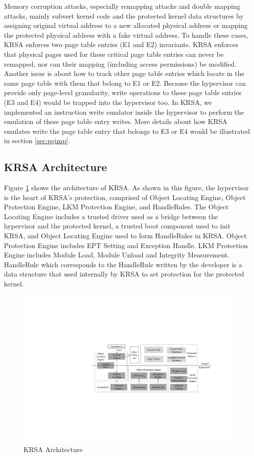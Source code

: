 \documentclass[conference]{IEEEtran}
\begin{document}
Memory corruption attacks, especially remapping attacks and double mapping attacks, mainly subvert kernel code and the protected kernel data structures by assigning original virtual address to a new allocated physical address or mapping the protected physical address with a fake virtual address. To handle these cases, KRSA enforces two page table entries (E1 and E2) invariants. KRSA enforces that physical pages used for these critical page table entries can never be remapped, nor can their mapping (including access permissions) be modified. 
Another issue is about how to track other page table entries which locate in the same page table with them that belong to E1 or E2. Because the hypervisor can provide only page-level granularity, write operations to these page table entries (E3 and E4) would be trapped into the hypervisor too. In KRSA, we implemented an instruction write emulator inside the hypervisor to perform the emulation of these page table entry writes. More details about how KRSA emulates write the page table entry that belongs to E3 or E4 would be illustrated in section \ref{sec:pgimp}.

\subsection{KRSA Architecture} \label{sec:archdesign}
Figure \ref{arch} shows the architecture of KRSA. As shown in this figure, the hypervisor is the heart of KRSA's protection, comprised of Object Locating Engine, Object Protection Engine, LKM Protection Engine, and HandleRules. The Object Locating Engine includes a trusted driver used as a bridge between the hypervisor and the protected kernel, a trusted boot component used to init KRSA, and Object Locating Engine used to form HandleRules in KRSA. Object Protection Engine includes EPT Setting and Exception Handle. LKM Protection Engine includes Module Load, Module Unload and Integrity Measurement. HandleRule which corresponds to the HandleRule written by the developer is a data structure that used internally by KRSA to set protection for the protected kernel.

\begin{figure}
    \centering
    \includegraphics[scale=0.5]{pic/architecture.pdf}
    \caption{KRSA Architecture}
    \label{arch}
\end{figure}
\end{document}
